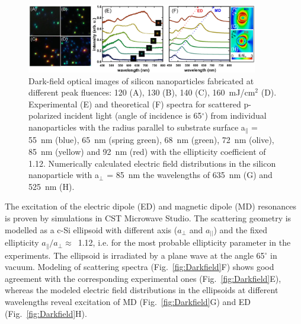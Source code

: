         \begin{figure}[h!]
                \begin{center}
                    \includegraphics[width=0.9\textwidth]{figs/results/char/DarkField.eps}
                \end{center}
                \label{fig:Darkfield}
                \caption{Dark-field optical images of silicon nanoparticles fabricated at different peak fluences:
                120 (A), 130 (B), 140 (C), 160~mJ/cm$^{2}$ (D). Experimental (E) and theoretical (F) spectra for
                scattered p-polarized incident light (angle of incidence is 65$^{\circ}$) from individual nanoparticles
                with the radius parallel to substrate surface a$_{\parallel}$ = 55~nm (blue), 65~nm (spring green),
                68~nm (green), 72~nm (olive), 85~nm (yellow) and 92~nm (red) with the ellipticity coefficient of 1.12.
                Numerically calculated electric field distributions in the silicon nanoparticle with a$_{\perp}$ = 85~nm
                 the wavelengths of 635~nm (G) and 525~nm (H).}\label{DF}
        \end{figure}


        The excitation of the electric dipole (ED) and magnetic dipole (MD) resonances is proven by simulations
        in CST Microwave Studio. The scattering geometry is modelled as a c-Si ellipsoid with different axis
        ($a_{\perp}$ and $a_{||}$) and the fixed ellipticity $a_{\parallel}/a_{\perp}\approx$~1.12, i.e. for
        the most probable ellipticity parameter in the experiments. The ellipsoid is irradiated by a plane wave
        at the angle 65$^{\circ}$ in vacuum. Modeling of scattering spectra (Fig.~\ref{fig:Darkfield}F) shows good agreement
        with the corresponding experimental ones (Fig.~\ref{fig:Darkfield}E), whereas the modeled electric field distributions
        in the ellipsoids at different wavelengths reveal excitation of MD (Fig.~\ref{fig:Darkfield}G) and ED (Fig.~\ref{fig:Darkfield}H).

    \subsection{}

